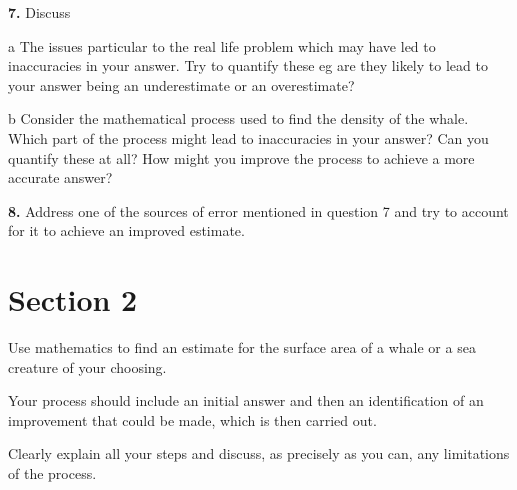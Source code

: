\documentclass[fleqn]{article}
\begin{document}
\textbf{7.}	Discuss 

a	The issues particular to the real life problem which may have led to inaccuracies in your answer.  Try to quantify these eg are they likely to lead to your answer being an underestimate or an overestimate?

b	Consider the mathematical process used to find the density of the whale.  Which part of the process might lead to inaccuracies in your answer?  Can you quantify these at all?  How might you improve the process to achieve a more accurate answer?

\textbf{8.}	Address one of the sources of error mentioned in question 7 and  try to account for it to achieve an improved estimate.


\section{Section 2}

Use mathematics to find an estimate for the surface area of a whale or a sea creature of your choosing. 

Your process should include an initial answer and then an identification of an improvement that could be made, which is then carried out.

Clearly explain all your steps  and discuss, as precisely as you can, any limitations of the process.  
\end{document}
